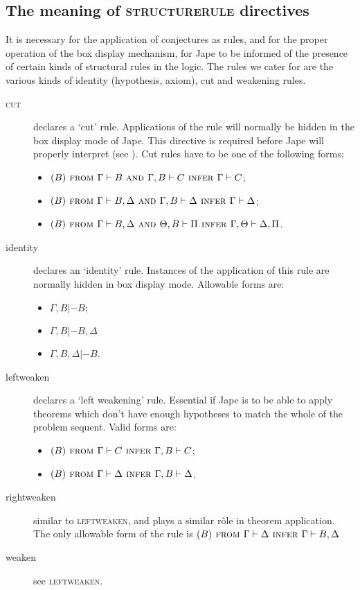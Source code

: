 \subsection{The meaning of \textsc{structurerule} directives}

It is necessary for the application of conjectures as rules, and for the proper operation of the box display mechanism, for Jape to be informed of the presence of certain kinds of structural rules in the logic. The rules we cater for are the various kinds of identity (hypothesis, axiom), cut and weakening rules.

\begin{description}
\item[\textsc{cut}] declares a `cut' rule. Applications of the rule will normally be hidden in the box display mode of Jape. This directive is required before Jape will properly interpret  (see ). Cut rules have to be one of the following forms: 
\begin{itemize}
\item $(B) \textsc{ from } \Gamma |- B \textsc{ and } \Gamma, B |- C \textsc{ infer } \Gamma |- C$; 
\item $(B) \textsc{ from } \Gamma |- B, \Delta \textsc{ and } \Gamma, B |- \Delta \textsc{ infer } \Gamma |- \Delta$;
\item $(B) \textsc{ from } \Gamma |- B, \Delta \textsc{ and } \Theta, B |- \Pi \textsc{ infer } \Gamma, \Theta |- \Delta, \Pi$.
\end{itemize}

\item[identity] declares an `identity' rule. Instances of the application of this rule are normally hidden in box display mode. Allowable forms are:
\begin{itemize}
\item $\Gamma, B |- B$;
\item $\Gamma, B |- B, \Delta$
\item $\Gamma, B, \Delta |- B$.
\end{itemize}

\item[leftweaken] declares a `left weakening' rule. Essential if Jape is to be able to apply theorems which don't have enough hypotheses to match the whole of the problem sequent. Valid forms are:
\begin{itemize}
\item $(B) \textsc{ from } \Gamma |- C \textsc{ infer } \Gamma, B |- C$;
\item $(B) \textsc{ from } \Gamma |- \Delta \textsc{ infer } \Gamma, B |- \Delta$.
\end{itemize}

\item[rightweaken] similar to \textsc{leftweaken}, and plays a similar r\^{o}le in theorem application. The only allowable form of the rule is $(B) \textsc{ from } \Gamma |- \Delta \textsc{ infer } \Gamma |- B, \Delta$

\item[weaken] see \textsc{leftweaken}.

\end{description}

